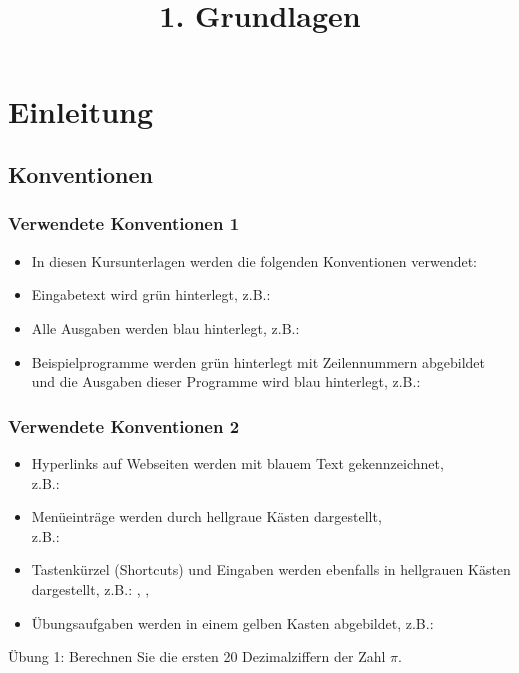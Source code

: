 

\title{\\{\scriptsize 1. Grundlagen}}


\setcounter{mchapter}{1}
\setcounter{mexercise}{0}


    

    \section{Einleitung}

    \subsection{Konventionen}
    \begin{frame}
        \frametitle{Verwendete Konventionen 1}
        \begin{itemize}
            \item In diesen Kursunterlagen werden die folgenden Konventionen verwendet:
            \item Eingabetext wird grün hinterlegt, z.B.: 
            \item Alle Ausgaben werden blau hinterlegt, z.B.: 
            \item Beispielprogramme werden grün hinterlegt mit Zeilennummern abgebildet und die Ausgaben dieser Programme
            wird blau hinterlegt, z.B.:
        \end{itemize}
    \end{frame}

    \begin{frame}
        \frametitle{Verwendete Konventionen 2}
        \begin{itemize}
            \item Hyperlinks auf Webseiten werden mit blauem Text gekennzeichnet, \\
            z.B.: 
            \item Menüeinträge werden durch hellgraue Kästen dargestellt, \\
            z.B.: 
            \item Tastenkürzel (Shortcuts) und Eingaben werden ebenfalls in hellgrauen Kästen dargestellt, z.B.: , \keys{\return}, 
            \item Übungsaufgaben werden in einem gelben Kasten abgebildet, z.B.:
        \end{itemize}
        \begin{exercise}
            \sloppy
            Übung 1: Berechnen Sie die ersten 20 Dezimalziffern der Zahl $\pi$.
        \end{exercise}
    \end{frame}

